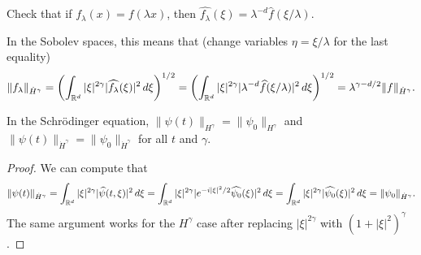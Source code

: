 \begin{exercise}
  Check that if $f_\lambda(x) = f(\lambda x)$, then
  $\widehat{f_\lambda}(\xi) = \lambda^{-d} \widehat{f}(\xi / \lambda)$.
\end{exercise}

\begin{remark}
  In the Sobolev spaces, this means that (change
  variables $\eta = \xi / \lambda$ for the last equality)
  \[
    \|f_\lambda\|_{\dot{H}^{\gamma}}
    = \left(\int_{\mathbb{R}^d} |\xi|^{2\gamma} |\widehat{f_\lambda}(\xi)|^2\, d\xi\right)^{1 / 2}
    = \left(\int_{\mathbb{R}^d} |\xi|^{2\gamma} |\lambda^{-d} \widehat{f}(\xi / \lambda)|^2\, d\xi\right)^{1 / 2}
    = \lambda^{\gamma - d / 2} \|f\|_{\dot{H}^{\gamma}}.
  \]
\end{remark}

\begin{lemma}
  In the Schr\"odinger equation, $\|\psi(t)\|_{H^{\gamma}} = \|\psi_0\|_{H^{\gamma}}$
  and $\|\psi(t)\|_{\dot{H}^{\gamma}} = \|\psi_0\|_{\dot{H}^{\gamma}}$
  for all $t$ and $\gamma$.
\end{lemma}

\begin{proof}
  We can compute that
  \[
    \|\psi(t)\|_{\dot{H}^{\gamma}}
    = \int_{\mathbb{R}^d} |\xi|^{2\gamma} |\widehat{\psi}(t, \xi)|^2\, d\xi
    = \int_{\mathbb{R}^d} |\xi|^{2\gamma} |e^{-i |\xi|^2 / 2}\widehat{\psi_0}(\xi)|^2\, d\xi
    = \int_{\mathbb{R}^d} |\xi|^{2\gamma} |\widehat{\psi_0}(\xi)|^2\, d\xi
    = \|\psi_0\|_{\dot{H}^{\gamma}}.
  \]
  The same argument works for the $H^{\gamma}$ case
  after replacing $|\xi|^{2\gamma}$ with
  $(1 + |\xi|^2)^\gamma$.
\end{proof}
